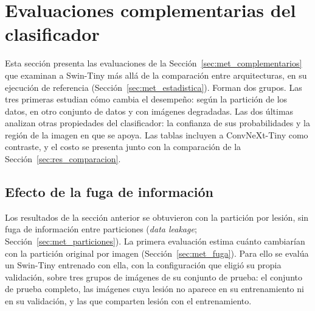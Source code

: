 \section{Evaluaciones complementarias del clasificador}
\label{sec:res_complementarios}

Esta sección presenta las evaluaciones de la Sección~\ref{sec:met_complementarios} que examinan a Swin-Tiny más allá de
la comparación entre arquitecturas, en su ejecución de referencia (Sección~\ref{sec:met_estadistica}). Forman dos
grupos. Las tres primeras estudian cómo cambia el desempeño: según la partición de los datos, en otro conjunto de
datos y con imágenes degradadas. Las dos últimas analizan otras propiedades del clasificador: la confianza de sus
probabilidades y la región de la imagen en que se apoya. Las tablas incluyen a ConvNeXt-Tiny como contraste, y el
costo se presenta junto con la comparación de la Sección~\ref{sec:res_comparacion}.

\subsection{Efecto de la fuga de información}
\label{sec:res_fuga}

Los resultados de la sección anterior se obtuvieron con la partición por lesión, sin fuga de información entre
particiones (\emph{data leakage}; Sección~\ref{sec:met_particiones}). La primera evaluación estima cuánto cambiarían
con la partición original por imagen (Sección~\ref{sec:met_fuga}). Para ello se evalúa un Swin-Tiny entrenado con ella, con la configuración que eligió su propia validación, sobre tres
grupos de imágenes de su conjunto de prueba: el conjunto de prueba completo, las imágenes cuya lesión no aparece en su entrenamiento ni en su
validación, y las que comparten lesión con el entrenamiento.

